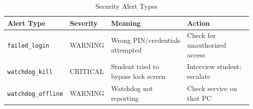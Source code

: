 \begin{table}[h!]
\centering
\caption{Security Alert Types}
\label{tab:alert-types}
\begin{tabularx}{\textwidth}{llXl}
\toprule
\textbf{Alert Type} & \textbf{Severity} & \textbf{Meaning} & \textbf{Action}\\
\midrule
\rowcolor{aurxonlightgray}
\texttt{failed\_login} & WARNING & Wrong PIN/credentials attempted & Check for unauthorized access\\
\texttt{watchdog\_kill} & CRITICAL & Student tried to bypass lock screen & Interview student; escalate\\
\rowcolor{aurxonlightgray}
\texttt{watchdog\_offline} & WARNING & Watchdog not reporting & Check service on that PC\\
\bottomrule
\end{tabularx}
\end{table}
